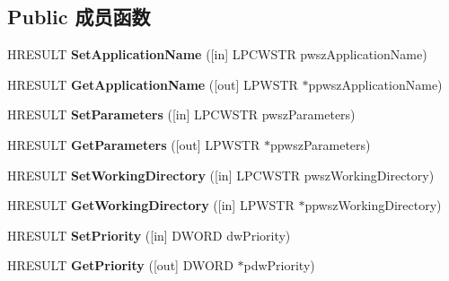 \subsection*{Public 成员函数}
\begin{DoxyCompactItemize}
\item 
\mbox{\label{interface_i_task_aa7b7edaf915b2c2f6e1a8f08f0a4b183}} 
H\+R\+E\+S\+U\+LT {\bfseries Set\+Application\+Name} (\mbox{[}in\mbox{]} L\+P\+C\+W\+S\+TR pwsz\+Application\+Name)
\item 
\mbox{\label{interface_i_task_aa79c0870de2425ff0f2df69c2031d3e8}} 
H\+R\+E\+S\+U\+LT {\bfseries Get\+Application\+Name} (\mbox{[}out\mbox{]} L\+P\+W\+S\+TR $\ast$ppwsz\+Application\+Name)
\item 
\mbox{\label{interface_i_task_a35195f86c5c3df7b4cae10a2b75c368c}} 
H\+R\+E\+S\+U\+LT {\bfseries Set\+Parameters} (\mbox{[}in\mbox{]} L\+P\+C\+W\+S\+TR pwsz\+Parameters)
\item 
\mbox{\label{interface_i_task_acd16992b76003a955c0c320ef279f424}} 
H\+R\+E\+S\+U\+LT {\bfseries Get\+Parameters} (\mbox{[}out\mbox{]} L\+P\+W\+S\+TR $\ast$ppwsz\+Parameters)
\item 
\mbox{\label{interface_i_task_a61c8079b21a3f4b57446f908fe8c715d}} 
H\+R\+E\+S\+U\+LT {\bfseries Set\+Working\+Directory} (\mbox{[}in\mbox{]} L\+P\+C\+W\+S\+TR pwsz\+Working\+Directory)
\item 
\mbox{\label{interface_i_task_a798217e1d9f3a361d03108e7018e305c}} 
H\+R\+E\+S\+U\+LT {\bfseries Get\+Working\+Directory} (\mbox{[}in\mbox{]} L\+P\+W\+S\+TR $\ast$ppwsz\+Working\+Directory)
\item 
\mbox{\label{interface_i_task_af96f65717a04ee9cb21c3a7b57e76a31}} 
H\+R\+E\+S\+U\+LT {\bfseries Set\+Priority} (\mbox{[}in\mbox{]} D\+W\+O\+RD dw\+Priority)
\item 
\mbox{\label{interface_i_task_a58f7c43d35fe975b76b7f9d7356cba04}} 
H\+R\+E\+S\+U\+LT {\bfseries Get\+Priority} (\mbox{[}out\mbox{]} D\+W\+O\+RD $\ast$pdw\+Priority)
\item 

\end{DoxyCompactItemize}
